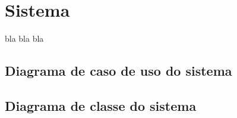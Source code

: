 \chapter[Sistema]{Sistema}

bla bla bla

\section{Diagrama de caso de uso do sistema}
\section{Diagrama de classe do sistema}
